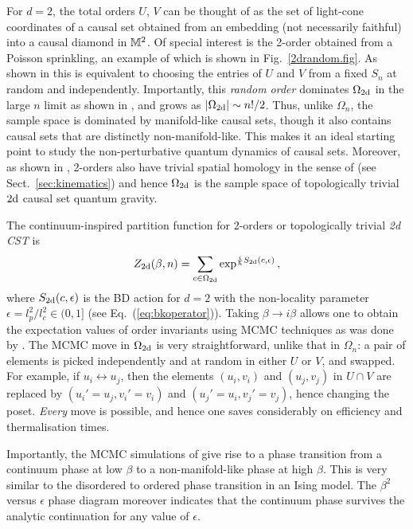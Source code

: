 For $d=2$, the total orders $U$, $V$ can be thought of as the set of light-cone coordinates of
a causal set obtained from an embedding (not necessarily faithful)  into a causal diamond in $\mathbb M^2$.  Of special
interest is the 2-order obtained from a Poisson sprinkling,   an example of which is
shown in Fig.~\ref{2drandom.fig}.   As shown in \cite{2dorders} this is equivalent to choosing the entries of  $U$ and $V$ from a fixed $S_n$ at
random and independently. Importantly, this \emph{random order}  dominates $\Omega_{\mathrm{2d}}$ in the large $n$ limit as shown in
\cite{es,winkler}, and grows as {$|\Omega_{\mathrm{2d}}| \sim n!/2 $}. Thus, unlike $\Omega_n$,  the sample space is dominated
by manifold-like causal sets, though it also contains causal sets that are distinctly non-manifold-like. This makes
it an ideal starting point to study the non-perturbative  quantum dynamics of causal sets. Moreover, as shown in
\cite{2dorders}, 2-orders also have trivial spatial homology in the sense of \cite{homology}  (see Sect.~\ref{sec:kinematics})  
and hence $\Omega_{\mathrm{2d}}$ is the sample space of topologically trivial $\mathrm{2d}$ causal set quantum gravity. 

The continuum-inspired partition function for 2-orders or topologically trivial \emph{2d CST}  is 
\begin{equation}
Z_{\mathrm{2d}}(\beta, n)=\sum_{c \in \Omega_{\mathrm{2d}}} \exp^{\frac{i}{\hbar} S_{\mathrm{2d}}(c,\epsilon)} \,,
  \end{equation} 
where $S_{\mathrm{2d}}(c,\epsilon)$ is the BD action for $d=2$ with the non-locality parameter $\epsilon=l_p^2/l_c^2 \in (0,1]$
(see Eq.~(\ref{eq:bkoperator})).   Taking  $\beta
\rightarrow i \beta$ allows one to obtain the expectation values of order invariants using  MCMC techniques as was done
by \cite{2dqg}.  The  MCMC move  in $\Omega_{\mathrm{2d}}$ is very straightforward,  unlike that in $\Omega_n$: a pair of elements is picked independently and at random in either $U$
or $V$, and swapped.  For example, if $u_i \leftrightarrow u_j$, then the elements 
$(u_i,v_i)$ and $(u_j,v_j)$ in $U\cap V$ are replaced by $(u_i'=u_j,v_i'=v_i)$  and $(u_j'=u_i,v_j'=v_j)$, hence
changing the poset. \emph{Every} move is possible, and hence one saves considerably on efficiency and thermalisation times.

Importantly, the  MCMC simulations of \cite{2dqg}  give rise to a phase transition  from a continuum phase at low $\beta$ to a non-manifold-like phase at high
$\beta$.  This is very similar to the disordered to ordered phase transition in an Ising model.  The 
$\beta^2$ versus $\epsilon$    phase diagram moreover indicates that the continuum phase survives the analytic
continuation for any value of $\epsilon$.   


